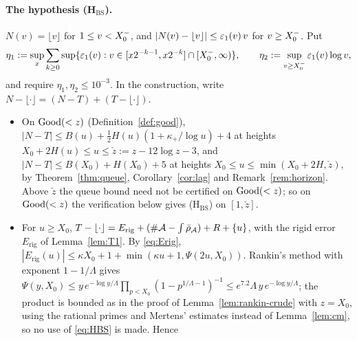 \paragraph{The hypothesis \textup{(H$_{\mathrm{BS}}$)}.} $N(v)=\lfloor v\rfloor$ for $1\le v<X_0^{-}$, and
$|N(v)-\lfloor v\rfloor|\le\varepsilon_1(v)\,v$ for $v\ge X_0^{-}$. Put
\begin{equation}\label{eq:HBS}
  \eta_1:=\sup_x\sum_{k\ge0}\sup\{\varepsilon_1(v):v\in[x2^{-k-1},x2^{-k}]\cap[X_0^{-},\infty)\},\qquad
  \eta_2:=\sup_{v\ge X_0^{-}}\varepsilon_1(v)\log v,
\end{equation}
and require $\eta_1,\eta_2\le 10^{-3}$. In the construction, write
$N-\lfloor\cdot\rfloor=(N-T)+(T-\lfloor\cdot\rfloor)$.
\begin{itemize}
\item On $\mathrm{Good}(<z)$ (Definition~\ref{def:good}), $|N-T|\le B(u)+\frac12H(u)(1+\kappa_+/\log u)+4$ at heights
  $X_0+2H(u)\le u\le\check z:=z-12\log z-3$, and $|N-T|\le B(X_0)+H(X_0)+5$ at heights $X_0\le u\le\min(X_0+2H,\check z)$, by Theorem~\ref{thm:queue},
  Corollary~\ref{cor:lag} and Remark~\ref{rem:horizon}. Above $\check z$ the queue bound need not be certified on $\mathrm{Good}(<z)$;
  so on $\mathrm{Good}(<z)$ the verification below gives \textup{(H$_{\mathrm{BS}}$)} on $[1,\check z]$.
\item For $u\ge X_0$, $T-\lfloor\cdot\rfloor=E_{\mathrm{rig}}+(\#\mathcal{A}-\textstyle\int\bar\rho_{\mathcal{A}})+R+\{u\}$, with the rigid error
  $E_{\mathrm{rig}}$ of Lemma~\ref{lem:T1}. By \eqref{eq:Erig},
  $|E_{\mathrm{rig}}(u)|\le\kappa X_0+1+\min(\kappa u+1,\Psi(2u,X_0))$. Rankin's method with exponent $1-1/\Lambda$ gives
  $\Psi(y,X_0)\le y\,e^{-\log y/\Lambda}\prod_{p<X_0}(1-p^{1/\Lambda-1})^{-1}\le e^{7.2}\Lambda\,y\,e^{-\log y/\Lambda}$; the product is
  bounded as in the proof of Lemma~\ref{lem:rankin-crude} with $z=X_0$, using the rational primes and Mertens' estimates
  \cite{RosserSchoenfeld1962} instead of Lemma~\ref{lem:cm}, so no use of \eqref{eq:HBS} is made. Hence

\end{itemize}
